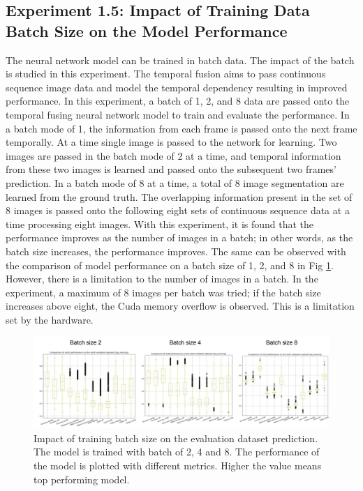 	\subsection{Experiment 1.5: Impact of Training Data Batch Size on the Model Performance}
	
	The neural network model can be trained in batch data. The impact of the batch is studied in this experiment. The temporal fusion aims to pass continuous sequence image data and model the temporal dependency resulting in improved performance. In this experiment, a batch of 1, 2, and 8 data are passed onto the temporal fusing neural network model to train and evaluate the performance. In a batch mode of 1, the information from each frame is passed onto the next frame temporally. At a time single image is passed to the network for learning. Two images are passed in the batch mode of 2 at a time, and temporal information from these two images is learned and passed onto the subsequent two frames' prediction. In a batch mode of 8 at a time, a total of 8 image segmentation are learned from the ground truth. The overlapping information present in the set of 8 images is passed onto the following eight sets of continuous sequence data at a time processing eight images. With this experiment, it is found that the performance improves as the number of images in a batch; in other words, as the batch size increases, the performance improves. The same can be observed with the comparison of model performance on a batch size of 1, 2, and 8 in Fig \ref{fig:batch_wise_performance}. However, there is a limitation to the number of images in a batch. In the experiment, a maximum of 8 images per batch was tried; if the batch size increases above eight, the Cuda memory overflow is observed. This is a limitation set by the hardware. 

	\begin{figure}
		\centering
		\includegraphics[width=16cm]{images/batch_wise_performance_comparison.png}
		\caption{Impact of training batch size on the evaluation dataset prediction. The model is trained with batch of 2, 4 and 8. The performance of the model is plotted with different metrics. Higher the value means top performing model.}
		\label{fig:batch_wise_performance}
	\end{figure}		    
	
